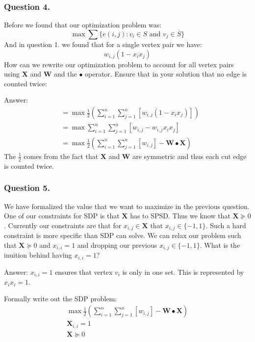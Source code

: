 \documentclass{article}
\begin{document}
\subsubsection{Question 4.}
Before we found that our optimization problem was:
\[
  \max \sum \{ e(i, j): v_i \in S \text{ and } v_j \in \overline{S} \}
\]
And in question 1. we found that for a single vertex pair we have:
\[
w_{i, j}(1 - x_i x_j)
\]
How can we rewrite our optimization problem to account for all vertex pairs using \( \mathbf{X} \) and \( \mathbf{W} \) and the \( \bullet \) operator.
Ensure that in your solution that no edge is counted twice:

Answer:
\begin{align*}
 &= \max \frac{1}{2} \left (\sum_{i = 1}^n \sum_{j = 1}^n[ w_{i, j}(1 - x_i x_j) ] \right)\\
 &= \max  \sum_{i = 1}^n \sum_{j = 1}^n[ w_{i, j} - w_{i, j} x_i x_j ]\\
 &= \max \frac{1}{2} \left ( \sum_{i = 1}^n \sum_{j = 1}^n[w_{i, j}] - \mathbf{W} \bullet \mathbf{X} \right )
\end{align*}
The \( \frac{1}{2} \) comes from the fact that \( \mathbf{X} \) and \( \mathbf{W} \) are symmetric and thus each cut edge is counted twice.

\subsubsection{Question 5.}
We have formalized the value that we want to maximize in the previous question.
One of our constraints for SDP is that \( \mathbf{X} \) has to SPSD.
Thus we know that \( \mathbf{X} \succeq 0 \).
Currently our constraints are that for \( x_{i, j} \in \mathbf{X} \) that \( x_{i, j} \in \{ -1, 1 \} \).
Such a hard constraint is more specific than SDP can solve.
We can relax our problem such that \( \mathbf{X} \succeq 0\) and \( x_{i, i} = 1 \) and dropping our previous \( x_{i, j} \in \{ -1, 1 \} \).
What is the inuition behind having \( x_{i, i} = 1 \)?

Answer: \( x_{i, i} = 1 \) ensures that vertex \( v_i \) is only in one set. This is represented by \( x_i x_i = 1 \).

Formally write out the SDP problem:
\begin{gather*}
\max \frac{1}{2} \left ( \sum_{i = 1}^n \sum_{j = 1}^n[w_{i, j}] - \mathbf{W} \bullet \mathbf{X} \right ) \\
\mathbf{X}_{i, i} = 1 \\
\mathbf{X} \succeq 0 \\
\end{gather*}
\end{document}

